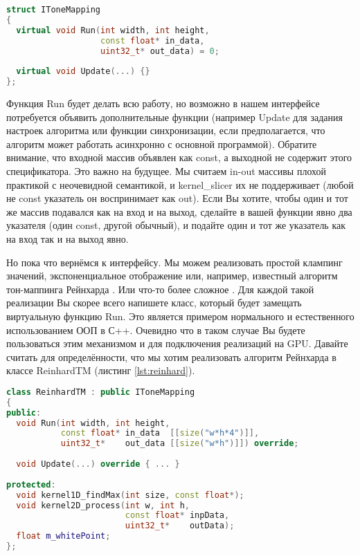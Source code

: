 \documentclass[11pt,fleqn,english,russian]{report} %
\begin{document}
\begin{lstlisting}[language=C++, caption=интерфейс алгоритмов тон-маппинга]
struct IToneMapping
{
  virtual void Run(int width, int height, 
                   const float* in_data,
                   uint32_t* out_data) = 0;
                   
  virtual void Update(...) {}                 
};
\end{lstlisting}\label{lst:tonemapping_api2}

Функция Run будет делать всю работу, но возможно в нашем интерфейсе потребуется объявить дополнительные функции (например Update для задания настроек алгоритма или функции синхронизации, если предполагается, что алгоритм может работать асинхронно с основной программой). Обратите внимание, что входной массив объявлен как const, а выходной не содержит этого спецификатора. Это важно на будущее. Мы считаем in-out массивы плохой практикой с неочевидной семантикой, и kernel\_slicer их не поддерживает (любой не const указатель он воспринимает как out). Если Вы хотите, чтобы один и тот же массив подавался как на вход и на выход, сделайте в вашей функции явно два указателя (один const, другой обычный), и подайте один и тот же указатель как на вход так и на выход явно.  

Но пока что вернёмся к интерфейсу. Мы можем реализовать простой клампинг значений, экспоненциальное отображение или, например, известный алгоритм тон-маппинга Рейнхарда \cite{Reinhard05}. Или что-то более сложное \cite{Mantiuk08}. Для каждой такой реализации Вы скорее всего напишете класс, который будет замещать виртуальную функцию Run. Это является примером нормального и естественного использованием ООП в С++. Очевидно что в таком случае Вы будете пользоваться этим механизмом и для подключения реализаций на GPU. Давайте считать для определённости, что мы хотим реализовать алгоритм Рейнхарда в классе ReinhardTM (листинг \ref{lst:reinhard}).

\begin{lstlisting}[language=C++, 
	               caption=класс для алгоритма Рейнхарда, 
	               label=lst:reinhard]	
class ReinhardTM : public IToneMapping
{
public:
  void Run(int width, int height, 
           const float* in_data  [[size("w*h*4")]], 
           uint32_t*    out_data [[size("w*h")]]) override;
		   
  void Update(...) override { ... }
   	
protected:
  void kernel1D_findMax(int size, const float*);
  void kernel2D_process(int w, int h, 
                        const float* inpData, 
                        uint32_t*    outData);
  float m_whitePoint;
};
\end{lstlisting}
\end{document}
